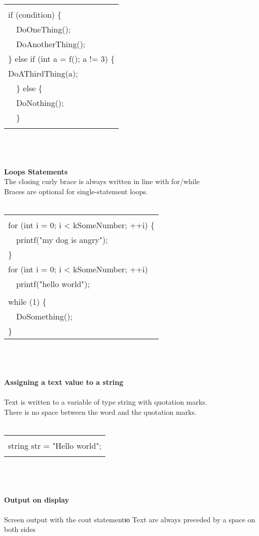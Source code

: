 \documentclass{article}
\begin{document}
\begin{tabular}{|p{}|}
\hline\\
if (condition) \{\\                   
\ \ DoOneThing();\\                    
\ \ DoAnotherThing();\\
\} else if (int a = f(); a != 3) \{\\   
  DoAThirdThing(a);\\
\ \ \} else \{\\
\ \ DoNothing();\\
\ \ \}\\ \\
\hline 
\end{tabular}\\ \\ \\
\textbf{\large{Loops Statements}}\\
The closing curly brace is always written in line with for/while\\
Braces are optional for single-statement loops.\\ \\

\begin{tabular}{|p{}|}
\hline\\
for (int i = 0; i < kSomeNumber; ++i) \{ \\
\ \ printf("my dog is angry"); \\
\} \\
for (int i = 0; i < kSomeNumber; ++i) \\
\ \ printf("hello world\n"); \\
\\
while (1) \{\\
\ \ DoSomething();\\
\} \\
\hline
\end{tabular}\\ \\ \\ 
\textbf{\large {Assigning a text value to a string}}\\ \\
Text is written to a variable of type string with quotation marks.\\
There is no space between the word and the quotation marks.\\ \\

\begin{tabular}{|p{}|}
\hline\\
string str = "Hello world";\\ \\
\hline
\end{tabular}\\ \\ \\
\textbf{\large {Output on display}}\\ \\
Screen output with the cout statementю
Text are always preceded by a space on both sides \ll \\ \\
\end{document}
